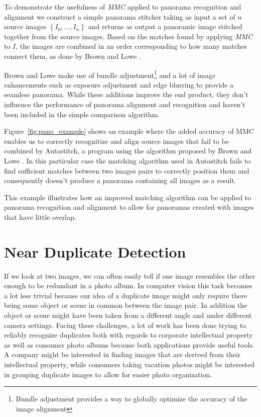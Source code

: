 To demonstrate the usefulness of \emph{MMC} applied to panorama 
recognition and alignment we construct a simple panorama stitcher taking
as input a set of $n$ source images $\left\{I_0, \ldots, I_n\right\}$ 
and returns as output a panoramic image stitched together from the 
source images. Based on the matches found by applying \emph{MMC} to $I$, 
the images are combined in an order corresponding to how many matches 
connect them, as done by Brown and Lowe \cite{brown2007automatic}.

Brown and Lowe make use of bundle adjustment\footnote{Bundle adjustment 
provides a way to globally optimize the accuracy of the image alignment} 
and a lot of image enhancements such as exposure adjustment and edge 
blurring to provide a seamless panorama. While these additions improve 
the end product, they don't influence the performance of panorama 
alignment and recognition and haven't been included in the simple 
comparison algorithm.

Figure~\ref{fig:pano_example} shows an example where the added accuracy 
of MMC enables us to correctly recognitize and align source images that 
fail to be combined by Autostitch, a program using the algorithm 
proposed by Brown and Lowe \cite{brown2007automatic}. In this particular
case the matching algorithm used in Autostitch fails to find sufficient 
matches between two images pairs to correctly position them and 
consequently doesn't produce a panorama containing all images as a 
result.

This example illustrates how an improved matching algorithm can be 
applied to panorama recognition and alignment to allow for panoramas 
created with images that have little overlap.

\section{Near Duplicate Detection}
If we look at two images, we can often easily tell if one image 
resembles the other enough to be redundant in a photo album. In computer 
vision this task becomes a lot less trivial because our idea of a 
duplicate image might only require there being some object or scene in 
common between the image pair. In addition the object or scene might 
have been taken from a different angle and under different camera 
settings. Facing these challenges, a lot of work has been done trying to 
reliably recognize duplicates both with regards to corporate 
intellectual property as well as consumer photo albums because both 
applications provide useful tools.  A company might be interested in 
finding images that are derived from their intellectual property, while 
consumers taking vacation photos might be interested in grouping 
duplicate images to allow for easier photo organization.


